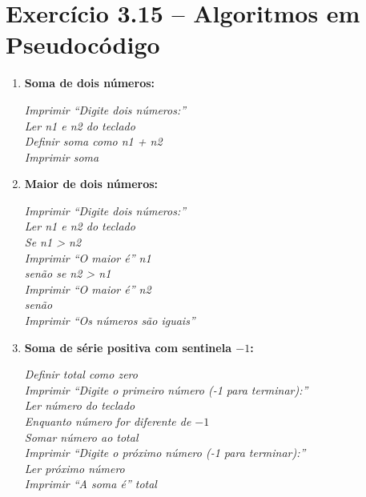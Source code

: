 \documentclass[12pt,a4paper]{article}
\begin{document}
\section{Exercício 3.15 -- Algoritmos em Pseudocódigo}

\begin{respostabox}
\begin{enumerate}[label=\textbf{\alph*)}]

\item \textbf{Soma de dois números:}
\begin{pseudo}
\textit{Imprimir ``Digite dois números:''}\\
\textit{Ler n1 e n2 do teclado}\\
\textit{Definir soma como n1 + n2}\\
\textit{Imprimir soma}
\end{pseudo}

\item \textbf{Maior de dois números:}
\begin{pseudo}
\textit{Imprimir ``Digite dois números:''}\\
\textit{Ler n1 e n2 do teclado}\\
\textit{Se n1 > n2}\\
\textit{\hphantom{Se}Imprimir ``O maior é'' n1}\\
\textit{senão se n2 > n1}\\
\textit{\hphantom{Se}Imprimir ``O maior é'' n2}\\
\textit{senão}\\
\textit{\hphantom{Se}Imprimir ``Os números são iguais''}
\end{pseudo}

\item \textbf{Soma de série positiva com sentinela $-1$:}
\begin{pseudo}
\textit{Definir total como zero}\\
\textit{Imprimir ``Digite o primeiro número (-1 para terminar):''}\\
\textit{Ler número do teclado}\\
\textit{Enquanto número for diferente de $-1$}\\
\textit{\hphantom{En}Somar número ao total}\\
\textit{\hphantom{En}Imprimir ``Digite o próximo número (-1 para terminar):''}\\
\textit{\hphantom{En}Ler próximo número}\\
\textit{Imprimir ``A soma é'' total}
\end{pseudo}

\end{enumerate}
\end{respostabox}
\end{document}
